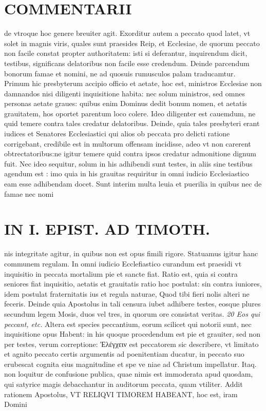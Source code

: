 \documentclass{article}
\begin{document}
\begin{pages}
\section*{COMMENTARII }
\marginpar{[ p.134 ]}\pstart de vtroque hoc genere breuiter agit.  \pend\pstart Exorditur autem a peccato quod latet, vt solet in magnis viris, quales sunt praesides Reip, et Ecclesiae, de quorum peccato non facile constat propter authoritatem: isti si deferantur, inquirendum dicit, testibus, significans delatoribus non facile esse credendum. Deinde parcendum bonorum famae et nomini, ne ad quosuis rumusculos palam traducamtur. Primum hic presbyterum accipio officio et aetate, hoc est, ministros Ecclesiae non damnandos nisi diligenti inquisitione habita: nec solum ministros, sed omnes personas aetate graues: quibus  enim Dominus dedit bonum nomen, et aetatis grauitatem, hos oportet parentum loco colere. Ideo diligenter est cauemdum, ne quid temere contra tales credatur delatoribus. Deinde, quia tales presbyteri erant iudices et Senatores Ecclesiastici qui alios ob peccata pro delicti ratione corrigebant, credibile est in multorum offensam incidisse, adeo vt non carerent obtrectatoribus:ne igitur temere quid contra ipsos credatur admonitione dignum fuit. Nec ideo sequitur, solum in his adhibendi sunt testes, in aliis sine testibus agendum est : imo quia in his grauitas requiritur in omni iudicio Ecclesiastico eam esse adhibendam docet. Sunt interim multa leuia et puerilia in quibus nec de famae nec nomi\pend
\section*{IN I. EPIST. AD TIMOTH. }
\marginpar{[ p.135. ]}\pstart nis integritate agitur, in quibus non est opus fimili rigore. Statuamus igitur hanc communem regulam. In omni iudicio Ecclefiastico curandum est praesidi vt inquisitio in peccata mortalium pie et sancte fiat. Ratio est, quia si contra seniores fiat inquisitio, aetatis et grauitatis ratio hoc postulat: sin contra iuniores, idem postulat fraternitatis ius et regula naturae, Quod tibi fieri nolis alteri ne feceris.  \pend\pstart Deinde quia Apostolus in tali censura iubet adhibere testes, eosque plures secundum legem Mosis, duos vel tres, in quorum ore consistat veritas.  \pend
\textit{20 Eos qui peccant, etc. }\pstart Altera est species peccantium, eorum scilicet qui notorii sunt, nec inquisitione opus Habent: in his quoque procedendum est pie et grauiter, sed non per testes, verum correptione: Ἐλέγχειν est peccatorem sic describere, vt limitato et agnito peccato certis argumentis ad poenitentiam ducatur, in peccato suo erubescat cognita eius magnitudine et spe ve niae ad Christum impellatur. Itaq. non loquitur de confusione publica, quae nimis est immoderata apud quosdam, qui satyrice magis debacchantur in auditorum peccata, quam vtiliter. Addit rationem Apostolus, VT RELIQVI TIMOREM HABEANT, hoc est, iram Domini  \pend

\end{pages}
\end{document}

